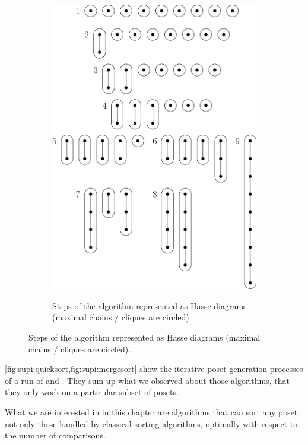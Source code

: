\begin{figure}
\begin{subfigure}[b]{0.4\textwidth}
{\includegraphics[width=\textwidth]{fig/supi/mergesort}} \caption{Steps of the
\mergesort algorithm represented as Hasse diagrams (maximal chains / cliques are
circled).} \label{fig:supi:mergesort} \end{subfigure} \end{figure}


\cref{fig:supi:quicksort,fig:supi:mergesort} show the iterative poset
generation processes of a run of \quicksort and \mergesort. They sum up what we
observed about those algorithms, that they only work on a particular subset of
posets.

What we are interested in in this chapter are algorithms that can sort any
poset, \ie not only those handled by classical sorting algorithms, optimally
with respect to the number of comparisons.
